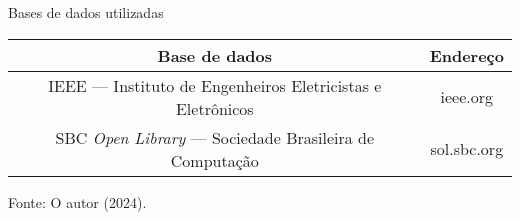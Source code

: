 \begin{quadro}[H]
\caption{Bases de dados utilizadas}
\centering
\begin{tabular}{|c|c|}
\hline
\rowcolor[HTML]{C0C0C0} 
\textbf{Base de dados}                                     & \textbf{Endereço} \\ \hline
IEEE — Instituto de Engenheiros Eletricistas e Eletrônicos & ieee.org          \\ \hline
SBC \textit{Open Library} — Sociedade Brasileira de Computação      & sol.sbc.org       \\ \hline
\end{tabular}
\newline
\newline
Fonte: O autor (2024).
\end{quadro}


